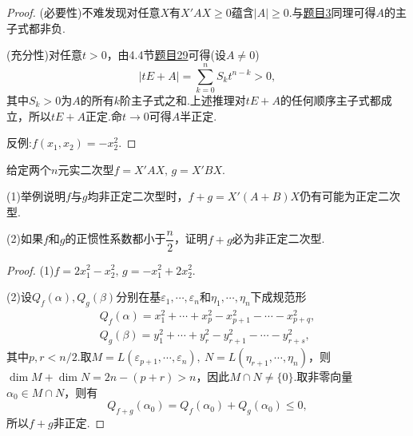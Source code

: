 \begin{proof}
	(必要性)不难发现对任意$X$有$X'AX\ge 0$蕴含$|A|\ge0$.与\hyperlink{PositiveDefiniteMinor}{题目3}同理可得$A$的主子式都非负.

	(充分性)对任意$t>0$，由4.4节\hyperlink{EigenPolynomial}{题目29}可得(设$A\ne0$)
	\[
		|tE+A|=\sum_{k=0}^{n}S_kt^{n-k}>0,
	\]
	其中$S_k>0$为$A$的所有$k$阶主子式之和.上述推理对$tE+A$的任何顺序主子式都成立，所以$tE+A$正定.命$t\to 0$可得$A$半正定.

	反例:$f(x_1,x_2)=-x_2^2$.
\end{proof}
\begin{prob}[12]
	给定两个$n$元实二次型$f=X'AX,\,g=X'BX$.

	(1)举例说明$f$与$g$均非正定二次型时，$f+g=X'(A+B)X$仍有可能为正定二次型.

	(2)如果$f$和$g$的正惯性系数都小于$\dfrac{n}{2}$，证明$f+g$必为非正定二次型.
\end{prob}
\begin{proof}
	(1)$f=2x_1^2-x_2^2,\,g=-x_1^2+2x_2^2$.

	(2)设$Q_f(\alpha),Q_g(\beta)$分别在基$\varepsilon_1,\cdots,\varepsilon_n$和$\eta_1,\cdots,\eta_n$下成规范形
	\begin{gather*}
		Q_f(\alpha)=x_1^2+\cdots+x_p^2-x_{p+1}^2-\cdots-x_{p+q}^2,\\
		Q_g(\beta)=y_1^2+\cdots+y_r^2-y_{r+1}^2-\cdots-y_{r+s}^2,
	\end{gather*}
	其中$p,r<n/2$.取$M=L(\varepsilon_{p+1},\cdots,\varepsilon_n),\ N=L(\eta_{r+1},\cdots,\eta_n)$，则$\dim M+\dim N=2n-(p+r)>n$，因此$M\cap N\ne\{0\}$.取非零向量$\alpha_0\in M\cap N$，则有
	\[
		Q_{f+g}(\alpha_0)=Q_f(\alpha_0)+Q_g(\alpha_0)\le 0,
	\]
	所以$f+g$非正定.
\end{proof}